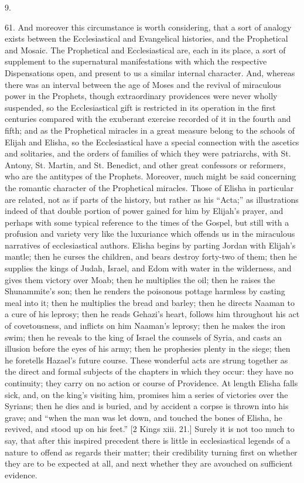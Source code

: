 9.

61.
And moreover this circumstance is worth considering, that a sort of
analogy exists between the Ecclesiastical and Evangelical histories,
and the Prophetical and Mosaic. The Prophetical and Ecclesiastical
are, each in its place, a sort of supplement to the supernatural
manifestations with which the respective Dispensations open, and
present to us a similar internal character. And, whereas there was an
interval between the age of Moses and the revival of miraculous power
in the Prophets, though extraordinary providences were never wholly
suspended, so the Ecclesiastical gift is restricted in its operation
in the first centuries compared with the exuberant exercise recorded
of it in the fourth and fifth; and as the Prophetical miracles
in a great measure belong to the schools of Elijah and Elisha, so the
Ecclesiastical have a special connection with the ascetics and
solitaries, and the orders of families of which they were patriarchs,
with St. Antony, St. Martin, and St. Benedict, and other great
confessors or reformers, who are the antitypes of the Prophets.
Moreover, much might be said concerning the romantic character of the
Prophetical miracles. Those of Elisha in particular are related, not
as if parts of the history, but rather as his ``Acta;'' as illustrations
indeed of that double portion of power gained for him by Elijah's
prayer, and perhaps with some typical reference to the times of the
Gospel, but still with a profusion and variety very like the
luxuriance which offends us in the miraculous narratives of
ecclesiastical authors. Elisha begins by parting Jordan with Elijah's
mantle; then he curses the children, and bears destroy forty-two of
them; then he supplies the kings of Judah, Israel, and Edom with water
in the wilderness, and gives them victory over Moab; then he
multiplies the oil; then he raises the Shunammite's son; then he
renders the poisonous pottage harmless by casting meal into it; then
he multiplies the bread and barley; then he directs Naaman to a cure
of his leprosy; then he reads Gehazi's heart, follows him throughout
his act of covetousness, and inflicts on him Naaman's leprosy; then he
makes the iron swim; then he reveals to the king of Israel the
counsels of Syria, and casts an illusion before the eyes of his army;
then he prophesies plenty in the siege; then he foretells Hazael's
future course. These wonderful acts are strung together as the direct
and formal subjects of the chapters in which they occur: they have no
continuity; they carry on no action or course of Providence. At length
Elisha falls sick, and, on the king's visiting him, promises him a
series of victories over the Syrians; then he dies and is buried, and
by accident a corpse is thrown into his grave; and ``when the man was
let down, and touched the bones of Elisha, he revived, and stood up on
his feet.'' [2 Kings xiii. 21.] Surely it is not too much to say, that
after this inspired precedent there is little in ecclesiastical
legends of a nature to offend as regards their matter; their
credibility turning first on whether they are to be expected at all,
and next whether they are avouched on sufficient evidence.

